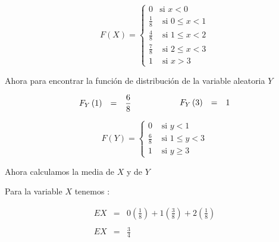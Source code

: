 \documentclass[12pt]{article}
\begin{document}
\begin{equation*}
    F\left(X\right) = \begin{cases}
        0           & \mbox{si   $x < 0 $}
        \\
        \frac{1}{8} & \mbox{   si   $0\le x < 1$}
        \\
        \frac{4}{8} & \mbox{   si   $1\le x < 2$}
        \\
        \frac{7}{8} & \mbox{   si   $2\le x < 3$}
        \\
        1           & \mbox{     si   $x>3$}
    \end{cases}
\end{equation*}


\begin{flushleft}
    Ahora para encontrar la funci\'on de distribuci\'on de la variable aleatoria $Y$
\end{flushleft}


\begin{equation*}
    \begin{array}{cp{1cm}c}
        \begin{array}{ccc}
            F_{Y} \left(1\right) & = & \displaystyle \frac{6}{8}
        \end{array}
         &
         &
        \begin{array}{ccc}
            F_{Y} \left(3\right) & = & 1
        \end{array}
    \end{array}
\end{equation*}

\begin{equation*}
    F\left(Y\right) = \begin{cases}
        0           & \mbox{ si   $y < 1 $}
        \\
        \frac{6}{8} & \mbox{ si   $1\leq y < 3$}
        \\
        1           & \mbox{ si   $y\geq 3$}
    \end{cases}
\end{equation*}

\begin{flushleft}
    Ahora calculamos la media de $X$ y de $Y$
\end{flushleft}

\begin{flushleft}
    Para la variable $X$ tenemos :
\end{flushleft}

\begin{equation*}
    \begin{array}{rcl}
        EX & = & \displaystyle 0 \left(\frac{1}{8}\right) + 1 \left(\frac{3}{8}\right) + 2 \left(\frac{1}{8}\right)
        \\
        \\
        EX & = & \displaystyle \frac{3}{4}
    \end{array}
\end{equation*}
\end{document}
